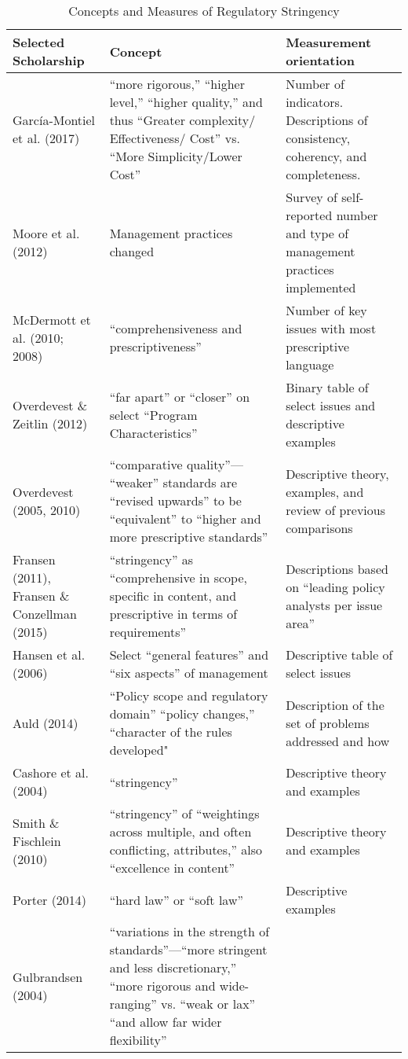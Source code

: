 \begin{table}
\caption{Concepts and Measures of Regulatory Stringency}
\label{review}
\footnotesize

\begin{tabular}{p{3.8cm}p{7.5cm}p{5cm}}
Selected Scholarship & Concept &	Measurement orientation \\
\hline
García-Montiel et al. (2017)&
“more rigorous,” “higher level,” “higher quality,” and thus “Greater complexity/ Effectiveness/ Cost” vs. “More Simplicity/Lower Cost”&
Number of indicators. Descriptions of consistency, coherency, and completeness.\\
\hline
Moore et al. (2012)&
Management practices changed &	
Survey of self-reported number and type of management practices implemented\\
\hline
McDermott et al. (2010; 2008)&
“comprehensiveness and prescriptiveness”&
Number of key issues with most prescriptive language\\
\hline
Overdevest \& Zeitlin (2012)&
“far apart” or “closer” on select “Program Characteristics”&
Binary table of select issues and descriptive examples\\
\hline
Overdevest (2005, 2010)&
“comparative quality”— “weaker” standards are “revised upwards” to be “equivalent” to “higher and more prescriptive standards”&
Descriptive theory, examples, and review of previous comparisons\\
\hline
Fransen (2011), Fransen \& Conzellman (2015)&
“stringency” as “comprehensive in scope, specific in content, and prescriptive in terms of requirements”&
Descriptions based on “leading policy analysts per issue area”\\
\hline
Hansen et al. (2006)&
Select “general features” and “six aspects” of management &
Descriptive table of select issues\\
\hline
Auld (2014)&	
“Policy scope and regulatory domain” “policy changes,” “character of the rules developed"&
Description of the set of problems addressed and how\\
\hline
Cashore et al. (2004)&	
“stringency”&
Descriptive theory and examples\\
\hline
Smith \& Fischlein (2010)&
 “stringency” of “weightings across multiple, and often conflicting, attributes,” also “excellence in content”&
Descriptive theory and examples\\
\hline
Porter (2014)&
“hard law” or “soft law”&
Descriptive examples\\
\hline
Gulbrandsen (2004)&
“variations in the strength of standards”—“more stringent and less discretionary,” “more rigorous and wide-ranging” vs. “weak or lax” “and allow far wider flexibility”

\end{tabular}
\end{table}
